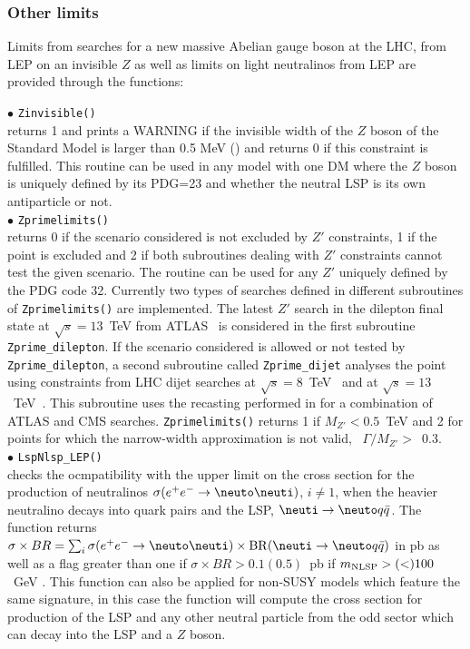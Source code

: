 \documentclass[12pt,a4paper]{article}
\begin{document}
\subsubsection{Other limits}

Limits from searches for a new massive Abelian gauge boson at the LHC, from LEP on an invisible $Z$ as well as limits on light neutralinos from LEP are provided through the functions: 


\noi$\bullet$ \verb|Zinvisible()|\\
returns 1 and prints a WARNING if the invisible width of the $Z$ boson of the Standard Model 
is larger than 0.5 MeV (\cite{Freitas:2014hra}) and returns 0 if this constraint is fulfilled.
This routine can be used in any model with one DM where the $Z$ boson is  uniquely defined by its PDG=23 and whether the neutral LSP is its own antiparticle or not.\\

\noi$\bullet$ \verb|Zprimelimits()|\\
returns 0 if the scenario considered is not excluded by $Z'$ constraints, 1 if the point is excluded and 2 if both subroutines dealing with $Z'$ constraints cannot test the given scenario. The routine can be used for any $Z'$ uniquely defined by the PDG code 32.
Currently two types of searches defined in different subroutines of \verb|Zprimelimits()| are implemented.
The latest $Z'$ search in the dilepton final state at $\sqrt{s} = 13$~TeV from ATLAS~\cite{Aaboud:2016cth} is considered in the first subroutine \verb|Zprime_dilepton|. If the scenario considered is allowed or not tested by \verb|Zprime_dilepton|, a second subroutine called \verb|Zprime_dijet| analyses the point using constraints from LHC dijet searches at $\sqrt{s} = 8$~TeV~\cite{Aad:2014aqa,Khachatryan:2015sja,Khachatryan:2016ecr} and at $\sqrt{s} = 13$~TeV~\cite{ATLAS:2015nsi,Khachatryan:2015dcf}. This subroutine uses the recasting  performed  in \cite{Fairbairn:2016iuf} for a combination of ATLAS and CMS searches.
\verb|Zprimelimits()| returns 1 if $M_{Z'}<0.5$~TeV and  2 for points  for which the narrow-width approximation is not valid, \ie~$\Gamma/M_{Z'}>$~0.3.\\

\noi$\bullet$   \verb|LspNlsp_LEP()|\\
checks  the ocmpatibility with the upper limit \cite{Abbiendi:2003sc} on the cross section for the production of neutralinos 
$\sigma(e^+e^-\rightarrow \neuto\neuti)$, $i\neq 1$, when the heavier neutralino decays into quark pairs 
and the LSP, $\neuti \rightarrow \neuto q\bar{q}$. The function  
 returns $\sigma \times BR = \sum_i \sigma(e^+e^-\rightarrow \neuto\neuti)\times {\rm BR}(\neuti \rightarrow \neuto q\bar{q})$ in pb as well as a flag greater than one if $\sigma \times BR>0.1(0.5)$~pb if $m_{\rm NLSP}> (<)100$~GeV \cite{Abbiendi:2003sc}. 
This function can also be applied for non-SUSY models which feature the same signature, in this case the function will compute the cross section for production of the LSP and any other neutral particle from the odd sector which can decay into the LSP and a $Z$ boson.\\
\end{document}
